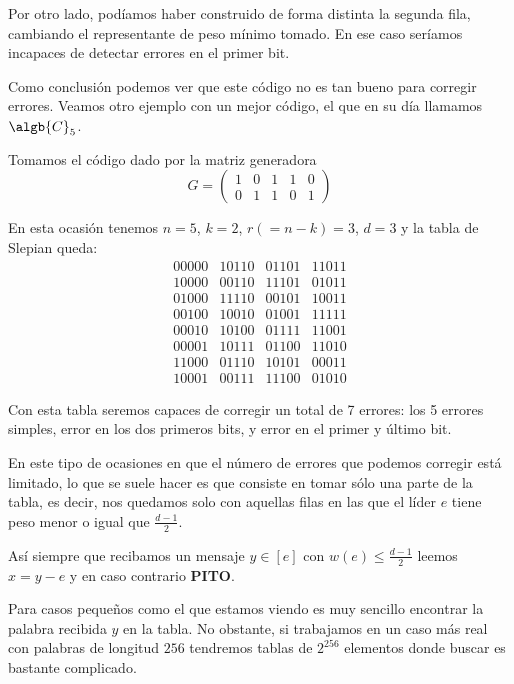 Por otro lado, podíamos haber construido de forma distinta la segunda fila, cambiando el representante de peso mínimo tomado. En ese caso seríamos incapaces de detectar errores en el primer bit.

Como conclusión podemos ver que este código no es tan bueno para corregir errores. Veamos otro ejemplo con un mejor código, el que en su día llamamos $\algb{C}_5$.

\begin{example}
Tomamos el código dado por la matriz generadora
\[G = \left(\begin{array}{ccccc} 1 & 0 & 1 & 1 & 0 \\ 0 & 1 & 1 & 0 & 1 \end{array}\right) \]

En esta ocasión tenemos $n=5$, $k=2$, $r(=n-k)=3$, $d=3$ y la tabla de Slepian queda:
\[\begin{array}{cccc}
00000 & 10110 & 01101 & 11011 \\
10000 & 00110 & 11101 & 01011 \\
01000 & 11110 & 00101 & 10011 \\
00100 & 10010 & 01001 & 11111 \\
00010 & 10100 & 01111 & 11001 \\
00001 & 10111 & 01100 & 11010 \\
11000 & 01110 & 10101 & 00011 \\
10001 & 00111 & 11100 & 01010
\end{array}\]

Con esta tabla seremos capaces de corregir un total de 7 errores: los 5 errores simples, error en los dos primeros bits, y error en el primer y último bit.

\end{example}

En este tipo de ocasiones en que el número de errores que podemos corregir está limitado, lo que se suele hacer es  que consiste en tomar sólo una parte de la tabla, es decir, nos quedamos solo con aquellas filas en las que el líder $e$ tiene peso menor o igual que $\frac{d-1}{2}$.

Así siempre que recibamos un mensaje $y \in [e]$ con $w(e) \leq \frac{d-1}{2}$ leemos $x=y-e$ y en caso contrario \textbf{PITO}.

Para casos pequeños como el que estamos viendo es muy sencillo encontrar la palabra recibida $y$ en la tabla. No obstante, si trabajamos en un caso más real con palabras de longitud $256$ tendremos tablas de $2^{256}$ elementos donde buscar es bastante complicado.

